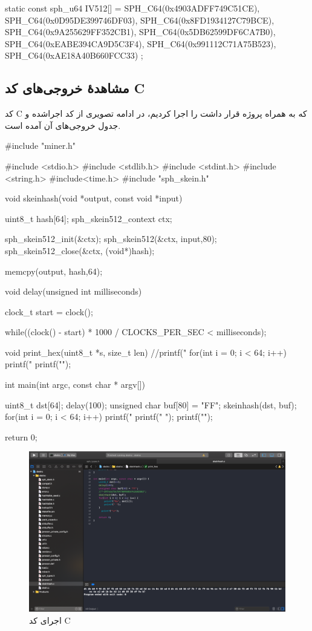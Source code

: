 \begin{ccode}
static const sph_u64 IV512[] = {
	SPH_C64(0x4903ADFF749C51CE), SPH_C64(0x0D95DE399746DF03),
	SPH_C64(0x8FD1934127C79BCE), SPH_C64(0x9A255629FF352CB1),
	SPH_C64(0x5DB62599DF6CA7B0), SPH_C64(0xEABE394CA9D5C3F4),
	SPH_C64(0x991112C71A75B523), SPH_C64(0xAE18A40B660FCC33)
};
\end{ccode}
\pagebreak
\subsection{مشاهدهٔ خروجی‌های کد C}
کد C که به همراه پروژه قرار داشت را اجرا کردیم، در ادامه تصویری از کد اجراشده و جدول خروجی‌های آن آمده است. 
\begin{ccode}
#include "miner.h"

#include <stdio.h>
#include <stdlib.h>
#include <stdint.h>
#include <string.h>
#include<time.h>
#include "sph_skein.h"



 void skeinhash(void *output, const void *input)
{
	uint8_t hash[64];
	sph_skein512_context ctx;
	
	sph_skein512_init(&ctx);
	sph_skein512(&ctx, input,80);
	sph_skein512_close(&ctx, (void*)hash);

	
	memcpy(output, hash,64);
}
void delay(unsigned int milliseconds){
    
    clock_t start = clock();
    
    while((clock() - start) * 1000 / CLOCKS_PER_SEC < milliseconds);
}
void print_hex(uint8_t *s, size_t len) {
    //printf("%
    for(int i = 0; i < 64; i++) {
        printf("%
    }
    printf("\n");
}

int main(int argc, const char * argv[]) {
    uint8_t dst[64];
    delay(100);
    unsigned char buf[80] = "FF";
       skeinhash(dst, buf);
    for(int i = 0; i < 64; i++) {
        printf("%
        printf(" ");
    }
      printf("\n");
  
    return 0;
}
\end{ccode}
\pagebreak
\begin{figure}[H]
\includegraphics[width= \textwidth]{figs/simulation/output1.png}
\caption{اجرای کد C}
\label{c_output_1}
\end{figure}



